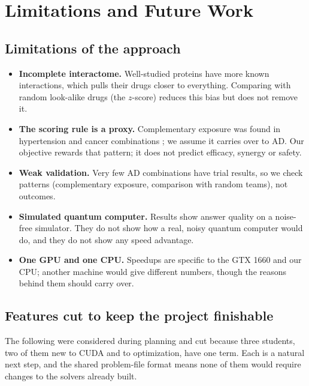 \section{Limitations and Future Work}
\label{app:limitations}

\subsection{Limitations of the approach}

\begin{itemize}
\item \textbf{Incomplete interactome.} Well-studied proteins have more known interactions, which pulls their drugs closer to everything. Comparing with random look-alike drugs (the $z$-score) reduces this bias but does not remove it.
\item \textbf{The scoring rule is a proxy.} Complementary exposure was found in hypertension and cancer combinations \cite{cheng2019combinations}; we assume it carries over to AD. Our objective rewards that pattern; it does not predict efficacy, synergy or safety.
\item \textbf{Weak validation.} Very few AD combinations have trial results, so we check patterns (complementary exposure, comparison with random teams), not outcomes.
\item \textbf{Simulated quantum computer.} Results show answer quality on a noise-free simulator. They do not show how a real, noisy quantum computer would do, and they do not show any speed advantage.
\item \textbf{One GPU and one CPU.} Speedups are specific to the GTX 1660 and our CPU; another machine would give different numbers, though the reasons behind them should carry over.
\end{itemize}

\subsection{Features cut to keep the project finishable}

The following were considered during planning and cut because three students, two of them new to CUDA and to optimization, have one term. Each is a natural next step, and the shared problem-file format means none of them would require changes to the solvers already built.

